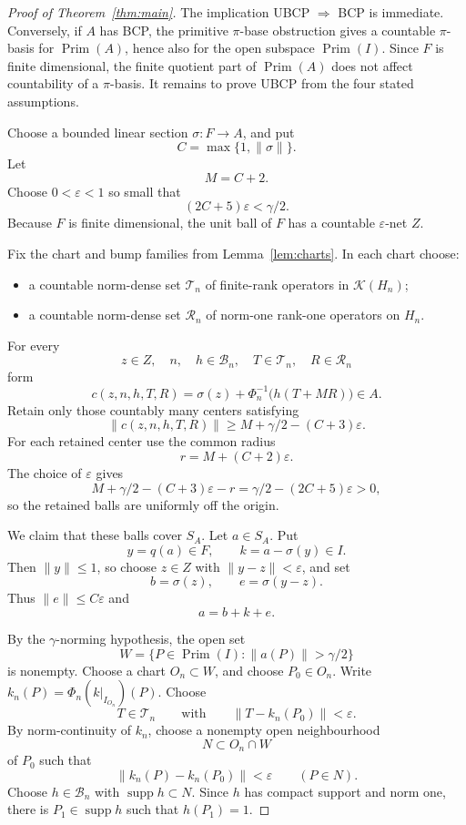 \documentclass[11pt]{article}
\newcommand{\Kcal}{\mathcal K}
\newcommand{\Prim}{\operatorname{Prim}}
\newcommand{\supp}{\operatorname{supp}}
\begin{document}
\begin{proof}[Proof of Theorem~\ref{thm:main}]
The implication UBCP \(\Rightarrow\) BCP is immediate.  Conversely, if \(A\)
has BCP, the primitive \(\pi\)-base obstruction gives a countable
\(\pi\)-basis for \(\Prim(A)\), hence also for the open subspace \(\Prim(I)\).
Since \(F\) is finite dimensional, the finite quotient part of \(\Prim(A)\)
does not affect countability of a \(\pi\)-basis.  It remains to prove UBCP
from the four stated assumptions.

Choose a bounded linear section \(\sigma:F\to A\), and put
\[
        C=\max\{1,\|\sigma\|\}.
\]
Let
\[
        M=C+2.
\]
Choose \(0<\varepsilon<1\) so small that
\[
        (2C+5)\varepsilon<\gamma/2.
\]
Because \(F\) is finite dimensional, the unit ball of \(F\) has a countable
\(\varepsilon\)-net \(Z\).

Fix the chart and bump families from Lemma~\ref{lem:charts}.  In each chart
choose:
\begin{itemize}
\item a countable norm-dense set \(\mathcal T_n\) of finite-rank operators in
      \(\Kcal(H_n)\);
\item a countable norm-dense set \(\mathcal R_n\) of norm-one rank-one
      operators on \(H_n\).
\end{itemize}
For every
\[
        z\in Z,\quad n,\quad h\in\mathcal B_n,\quad
        T\in\mathcal T_n,\quad R\in\mathcal R_n
\]
form
\[
        c(z,n,h,T,R)
        =
        \sigma(z)+\Phi_n^{-1}\bigl(h(T+MR)\bigr)\in A.
\]
Retain only those countably many centers satisfying
\[
        \|c(z,n,h,T,R)\|\ge M+\gamma/2-(C+3)\varepsilon.
\]
For each retained center use the common radius
\[
        r=M+(C+2)\varepsilon.
\]
The choice of \(\varepsilon\) gives
\[
        M+\gamma/2-(C+3)\varepsilon-r
        =
        \gamma/2-(2C+5)\varepsilon>0,
\]
so the retained balls are uniformly off the origin.

We claim that these balls cover \(S_A\).  Let \(a\in S_A\).  Put
\[
        y=q(a)\in F,\qquad k=a-\sigma(y)\in I.
\]
Then \(\|y\|\le1\), so choose \(z\in Z\) with \(\|y-z\|<\varepsilon\), and set
\[
        b=\sigma(z),\qquad e=\sigma(y-z).
\]
Thus \(\|e\|\le C\varepsilon\) and
\[
        a=b+k+e.
\]

By the \(\gamma\)-norming hypothesis, the open set
\[
        W=\{P\in\Prim(I):\|a(P)\|>\gamma/2\}
\]
is nonempty.  Choose a chart \(O_n\subset W\), and choose \(P_0\in O_n\).
Write \(k_n(P)=\Phi_n(k|_{I_{O_n}})(P)\).  Choose
\[
        T\in\mathcal T_n
        \qquad\text{with}\qquad
        \|T-k_n(P_0)\|<\varepsilon.
\]
By norm-continuity of \(k_n\), choose a nonempty open neighbourhood
\[
        N\subset O_n\cap W
\]
of \(P_0\) such that
\[
        \|k_n(P)-k_n(P_0)\|<\varepsilon\qquad(P\in N).
\]
Choose \(h\in\mathcal B_n\) with \(\supp h\subset N\).  Since \(h\) has
compact support and norm one, there is \(P_1\in\supp h\) such that
\(h(P_1)=1\).


\end{proof}
\end{document}
